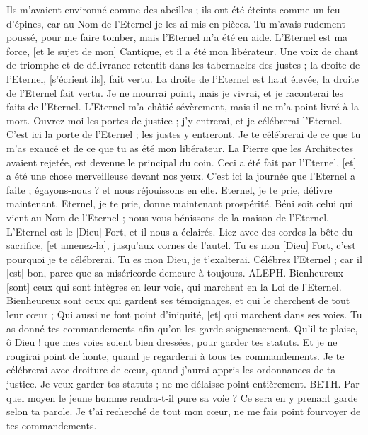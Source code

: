 \begin{multicols}{2}
Ils m'avaient environné comme des abeilles ; ils ont été éteints comme un feu d'épines, car au Nom de l'Eternel je les ai mis en pièces.
Tu m'avais rudement poussé, pour me faire tomber, mais l'Eternel m'a été en aide.
L'Eternel est ma force, [et le sujet de mon] Cantique, et il a été mon libérateur.
Une voix de chant de triomphe et de délivrance retentit dans les tabernacles des justes ; la droite de l'Eternel, [s'écrient ils], fait vertu.
La droite de l'Eternel est haut élevée, la droite de l'Eternel fait vertu.
Je ne mourrai point, mais je vivrai, et je raconterai les faits de l'Eternel.
L’Eternel m'a châtié sévèrement, mais il ne m'a point livré à la mort.
Ouvrez-moi les portes de justice ; j'y entrerai, et je célébrerai l'Eternel.
C'est ici la porte de l'Eternel ; les justes y entreront.
Je te célébrerai de ce que tu m'as exaucé et de ce que tu as été mon libérateur.
La Pierre que les Architectes avaient rejetée, est devenue le principal du coin.
Ceci a été fait par l'Eternel, [et] a été une chose merveilleuse devant nos yeux.
C'est ici la journée que l'Eternel a faite ; égayons-nous ? et nous réjouissons en elle.
Eternel, je te prie, délivre maintenant. Eternel, je te prie, donne maintenant prospérité.
Béni soit celui qui vient au Nom de l'Eternel ; nous vous bénissons de la maison de l'Eternel.
L'Eternel est le [Dieu] Fort, et il nous a éclairés. Liez avec des cordes la bête du sacrifice, [et amenez-la], jusqu’aux cornes de l'autel.
Tu es mon [Dieu] Fort, c'est pourquoi je te célébrerai. Tu es mon Dieu, je t'exalterai.
Célébrez l'Eternel ; car il [est] bon, parce que sa miséricorde demeure à toujours.
\VerseOne{}ALEPH. Bienheureux [sont] ceux qui sont intègres en leur voie, qui marchent en la Loi de l'Eternel.
Bienheureux sont ceux qui gardent ses témoignages, et qui le cherchent de tout leur cœur ;
Qui aussi ne font point d'iniquité, [et] qui marchent dans ses voies.
Tu as donné tes commandements afin qu'on les garde soigneusement.
Qu'il te plaise, ô Dieu ! que mes voies soient bien dressées, pour garder tes statuts.
Et je ne rougirai point de honte, quand je regarderai à tous tes commandements.
Je te célébrerai avec droiture de cœur, quand j'aurai appris les ordonnances de ta justice.
Je veux garder tes statuts ; ne me délaisse point entièrement.
BETH. Par quel moyen le jeune homme rendra-t-il pure sa voie ? Ce sera en y prenant garde selon ta parole.
Je t'ai recherché de tout mon cœur, ne me fais point fourvoyer de tes commandements.

\end{multicols}
